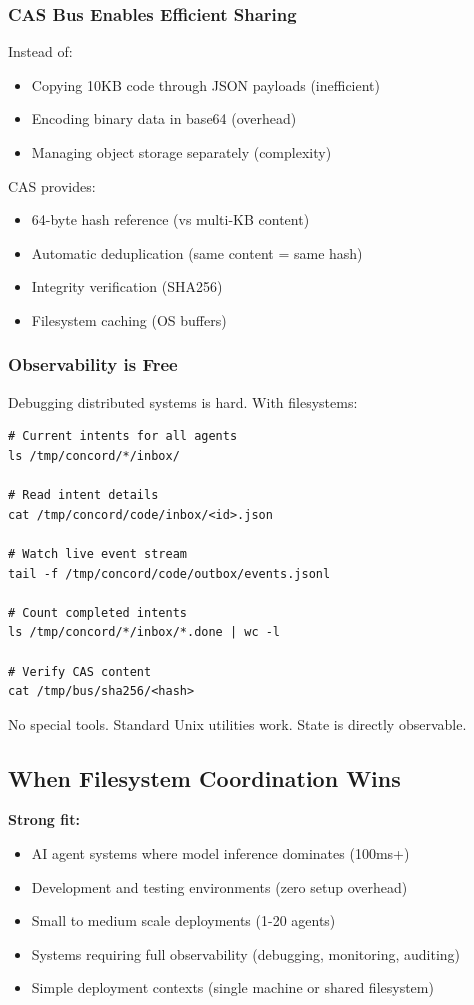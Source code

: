 \documentclass[11pt]{article}
\begin{document}
\subsubsection{CAS Bus Enables Efficient Sharing}

Instead of:
\begin{itemize}
\item Copying 10KB code through JSON payloads (inefficient)
\item Encoding binary data in base64 (overhead)
\item Managing object storage separately (complexity)
\end{itemize}

CAS provides:
\begin{itemize}
\item 64-byte hash reference (vs multi-KB content)
\item Automatic deduplication (same content = same hash)
\item Integrity verification (SHA256)
\item Filesystem caching (OS buffers)
\end{itemize}

\subsubsection{Observability is Free}

Debugging distributed systems is hard. With filesystems:

\begin{lstlisting}
# Current intents for all agents
ls /tmp/concord/*/inbox/

# Read intent details
cat /tmp/concord/code/inbox/<id>.json

# Watch live event stream
tail -f /tmp/concord/code/outbox/events.jsonl

# Count completed intents
ls /tmp/concord/*/inbox/*.done | wc -l

# Verify CAS content
cat /tmp/bus/sha256/<hash>
\end{lstlisting}

No special tools. Standard Unix utilities work. State is directly observable.

\subsection{When Filesystem Coordination Wins}

\textbf{Strong fit:}
\begin{itemize}
\item AI agent systems where model inference dominates (100ms+)
\item Development and testing environments (zero setup overhead)
\item Small to medium scale deployments (1-20 agents)
\item Systems requiring full observability (debugging, monitoring, auditing)
\item Simple deployment contexts (single machine or shared filesystem)
\end{itemize}
\end{document}
